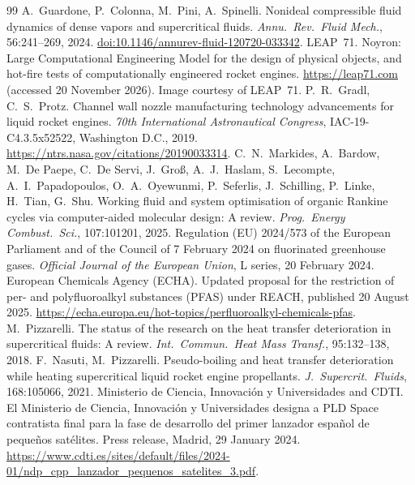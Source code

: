 \documentclass[11pt]{article}
\begin{document}
\begin{thebibliography}{99}\small
{}
A.\ Guardone, P.\ Colonna, M.\ Pini, A.\ Spinelli.
Nonideal compressible fluid dynamics of dense vapors and supercritical fluids.
\emph{Annu.\ Rev.\ Fluid Mech.}, 56:241--269, 2024.
\href{https://doi.org/10.1146/annurev-fluid-120720-033342}{doi:10.1146/annurev-fluid-120720-033342}.
 LEAP~71. Noyron: Large Computational Engineering Model for the design of physical objects, and hot-fire tests of computationally engineered rocket engines. \url{https://leap71.com} (accessed 20 November 2026). Image courtesy of LEAP~71.
 P.\ R.\ Gradl, C.\ S.\ Protz. Channel wall nozzle manufacturing technology advancements for liquid rocket engines. \emph{70th International Astronautical Congress}, IAC-19-C4.3.5x52522, Washington D.C., 2019. \url{https://ntrs.nasa.gov/citations/20190033314}.
 C.\ N.\ Markides, A.\ Bardow, M.\ De Paepe, C.\ De Servi, J.\ Gro\ss, A.\ J.\ Haslam, S.\ Lecompte, A.\ I.\ Papadopoulos, O.\ A.\ Oyewunmi, P.\ Seferlis, J.\ Schilling, P.\ Linke, H.\ Tian, G.\ Shu. Working fluid and system optimisation of organic Rankine cycles via computer-aided molecular design: A review. \emph{Prog.\ Energy Combust.\ Sci.}, 107:101201, 2025.
 Regulation (EU) 2024/573 of the European Parliament and of the Council of 7 February 2024 on fluorinated greenhouse gases. \emph{Official Journal of the European Union}, L series, 20 February 2024.
 European Chemicals Agency (ECHA). Updated proposal for the restriction of per- and polyfluoroalkyl substances (PFAS) under REACH, published 20 August 2025. \url{https://echa.europa.eu/hot-topics/perfluoroalkyl-chemicals-pfas}.
 M.\ Pizzarelli. The status of the research on the heat transfer deterioration in supercritical fluids: A review. \emph{Int.\ Commun.\ Heat Mass Transf.}, 95:132--138, 2018.
 F.\ Nasuti, M.\ Pizzarelli. Pseudo-boiling and heat transfer deterioration while heating supercritical liquid rocket engine propellants. \emph{J.\ Supercrit.\ Fluids}, 168:105066, 2021.
 Ministerio de Ciencia, Innovaci\'on y Universidades and CDTI. El Ministerio de Ciencia, Innovaci\'on y Universidades designa a PLD Space contratista final para la fase de desarrollo del primer lanzador espa\~nol de peque\~nos sat\'elites. Press release, Madrid, 29 January 2024. \url{https://www.cdti.es/sites/default/files/2024-01/ndp_cpp_lanzador_pequenos_satelites_3.pdf}.

\end{thebibliography}
\end{document}
